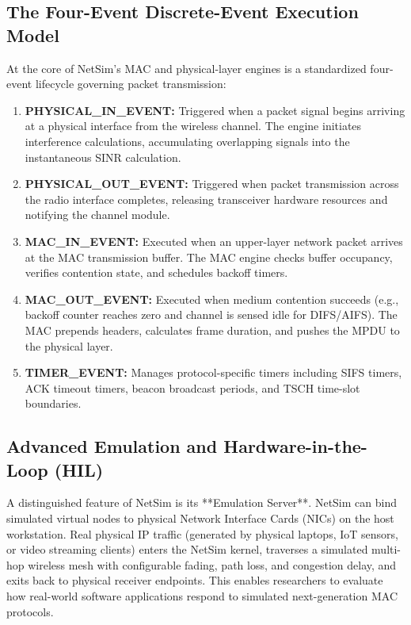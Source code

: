 \subsection{The Four-Event Discrete-Event Execution Model}
At the core of NetSim's MAC and physical-layer engines is a standardized four-event lifecycle governing packet transmission:
\begin{enumerate}
    \item \textbf{PHYSICAL\_IN\_EVENT:} Triggered when a packet signal begins arriving at a physical interface from the wireless channel. The engine initiates interference calculations, accumulating overlapping signals into the instantaneous SINR calculation.
    \item \textbf{PHYSICAL\_OUT\_EVENT:} Triggered when packet transmission across the radio interface completes, releasing transceiver hardware resources and notifying the channel module.
    \item \textbf{MAC\_IN\_EVENT:} Executed when an upper-layer network packet arrives at the MAC transmission buffer. The MAC engine checks buffer occupancy, verifies contention state, and schedules backoff timers.
    \item \textbf{MAC\_OUT\_EVENT:} Executed when medium contention succeeds (e.g., backoff counter reaches zero and channel is sensed idle for DIFS/AIFS). The MAC prepends headers, calculates frame duration, and pushes the MPDU to the physical layer.
    \item \textbf{TIMER\_EVENT:} Manages protocol-specific timers including SIFS timers, ACK timeout timers, beacon broadcast periods, and TSCH time-slot boundaries.
\end{enumerate}

\subsection{Advanced Emulation and Hardware-in-the-Loop (HIL)}
A distinguished feature of NetSim is its **Emulation Server**. NetSim can bind simulated virtual nodes to physical Network Interface Cards (NICs) on the host workstation. Real physical IP traffic (generated by physical laptops, IoT sensors, or video streaming clients) enters the NetSim kernel, traverses a simulated multi-hop wireless mesh with configurable fading, path loss, and congestion delay, and exits back to physical receiver endpoints. This enables researchers to evaluate how real-world software applications respond to simulated next-generation MAC protocols.

